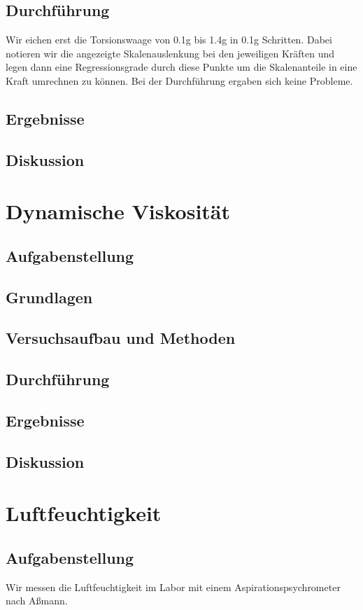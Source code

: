 \documentclass{article}
\begin{document}
\subsection{Durchführung}
Wir eichen erst die Torsionswaage von 0.1g bis 1.4g in 0.1g Schritten. Dabei notieren wir die angezeigte Skalenauslenkung bei den jeweiligen Kräften und legen dann eine Regressionsgrade durch diese Punkte um die Skalenanteile in eine Kraft umrechnen zu können.
Bei der Durchführung ergaben sich keine Probleme.
\subsection{Ergebnisse}

\subsection{Diskussion}
\section{Dynamische Viskosität}
\subsection{Aufgabenstellung}
\subsection{Grundlagen}
\subsection{Versuchsaufbau und Methoden}
\subsection{Durchführung}
\subsection{Ergebnisse}
\subsection{Diskussion}
\section{Luftfeuchtigkeit}
\subsection{Aufgabenstellung}
Wir messen die Luftfeuchtigkeit im Labor mit einem Aspirationspsychrometer nach Aßmann.
\end{document}
